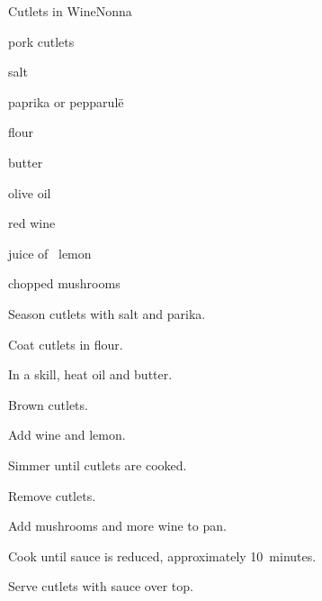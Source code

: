 \begin{recipe}{Cutlets in Wine}{Nonna}{}

\begin{ingredients}
\item pork cutlets
\item salt
\item paprika or pepparul\"e
\item flour
\item butter
\item olive oil
\item red wine
\item juice of \half{}~lemon
\item chopped mushrooms
\end{ingredients}

\begin{directions}
\item Season cutlets with salt and parika.
\item Coat cutlets in flour.
\item In a skill, heat oil and butter.
\item Brown cutlets.
\item Add wine and lemon.
\item Simmer until cutlets are cooked.
\item Remove cutlets.
\item Add mushrooms and more wine to pan.
\item Cook until sauce is reduced, approximately 10~minutes.
\item Serve cutlets with sauce over top.
\end{directions}

\end{recipe}
